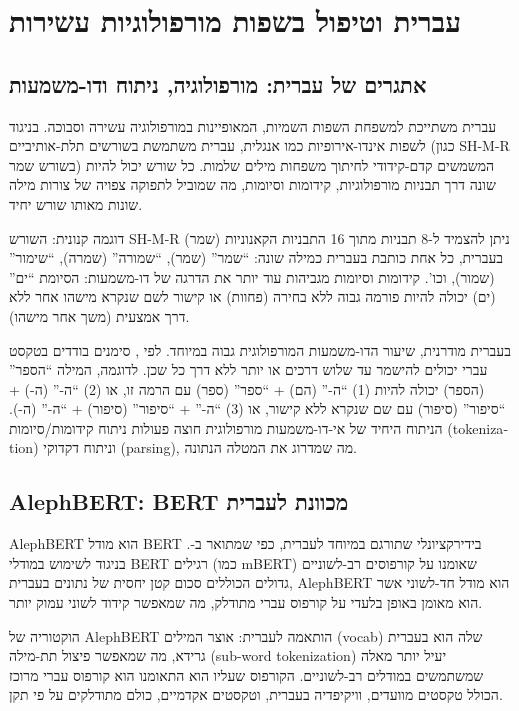 \chapter{עברית וטיפול בשפות מורפולוגיות עשירות}

\section{אתגרים של עברית: מורפולוגיה, ניתוח ודו-משמעות}

עברית משתייכת למשפחת השפות השמיות, המאופיינות במורפולוגיה עשירה וסבוכה. בניגוד לשפות אינדו-אירופיות כמו אנגלית, עברית משתמשת בשורשים תלת-אותיביים (כגון \textenglish{SH-M-R} בשורש שמר) המשמשים קדם-קידודי לחיתוך משפחות מילים שלמות. כל שורש יכול להיות שונה דרך תבניות מורפולוגיות, קידומות וסיומות, מה שמוביל לתפוקה צפויה של צורות מילה שונות מאותו שורש יחיד.

דוגמה קנונית: השורש \textenglish{SH-M-R} (שמר) ניתן להצמיד ל-8 תבניות מתוך 16 התבניות הקאנוניות בעברית, כל אחת כותבת בעברית כמילה שונה: ``שמר'' (שמר), ``שמורה'' (שמרה), ``שימור'' (שמור), וכו'. קידומות וסיומות מגביהות עוד יותר את הדרגה של דו-משמעות: הסיומת ``ים'' (ים) יכולה להיות פורמה גבוה ללא בחירה (פחוות) או קישור לשם שנקרא מישהו אחר ללא דרך אמצעית (משך אחר מישהו).

בעברית מודרנית, שיעור הדו-משמעות המורפולוגית גבוה במיוחד. לפי \cite{more2019joint}, סימנים בודדים בטקסט עברי יכולים להישמר עד שלוש דרכים או יותר ללא דרך כל שכן. לדוגמה, המילה ``הספר'' (הספר) יכולה להיות (1) ``ה-'' (הם) + ``ספר'' (ספר) עם הרמה זו, או (2) ``ה-'' (ה-) + ``סיפור'' (סיפור) עם שם שנקרא ללא קישור, או (3) ``ה-'' + ``סיפור'' (סיפור) + ``ה-'' (ה-). הניתוח היחיד של אי-דו-משמעות מורפולוגית חוצה פעולות ניתוח קידומות/סיומות (\textenglish{tokenization}) וניתוח דקדוקי (\textenglish{parsing}), מה שמדרוג את המטלה הנתונה.

\section{\textenglish{AlephBERT}: \textenglish{BERT} מכוונת לעברית}

\textenglish{AlephBERT} הוא מודל \textenglish{BERT} בידירקציונלי שתורגם במיוחד לעברית, כפי שמתואר ב-\cite{alephbert2023hebrew}. בניגוד לשימוש במודלי \textenglish{BERT} רגילים (כמו \textenglish{mBERT}) שאומנו על קורפוסים רב-לשוניים גדולים הכוללים סכום קטן יחסית של נתונים בעברית, \textenglish{AlephBERT} הוא מודל חד-לשוני אשר הוא מאומן באופן בלעדי על קורפוס עברי מתודלק, מה שמאפשר קידוד לשוני עמוק יותר.

הוקטוריה של \textenglish{AlephBERT} הותאמה לעברית: אוצר המילים (\textenglish{vocab}) שלה הוא בעברית גרידא, מה שמאפשר פיצול תת-מילה (\textenglish{sub-word tokenization}) יעיל יותר מאלה שמשתמשים במודלים רב-לשוניים. הקורפוס שעליו הוא התאומנו הוא קורפוס עברי מרוכז הכולל טקסטים מוועדים, וויקיפדיה בעברית, וטקסטים אקדמיים, כולם מתודלקים על פי תקן.

